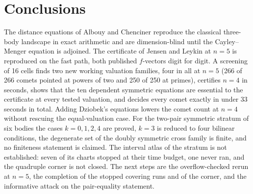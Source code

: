 \documentclass[11pt]{article}
\theoremstyle{definition}
\theoremstyle{remark}
\begin{document}
\section{Conclusions}\label{sec:conclusions}

The distance equations of Albouy and Chenciner reproduce the classical three-body landscape in exact arithmetic and are dimension-blind until the Cayley--Menger equation is adjoined. The
certificate of Jensen and Leykin at $n=5$ is reproduced on the fast path, both published $f$-vectors digit for digit. A screening of 16 cells finds two new working valuation families, four in all
at $n=5$ (266 of 266 comets pointed at powers of two and 250 of 250 at primes), certifies $n=4$ in seconds, shows that the ten dependent symmetric equations are essential to the certificate at
every tested valuation, and decides every comet exactly in under 33 seconds in total. Adding Dziobek's equations lowers the comet count at $n=4$ without rescuing the equal-valuation case. For the
two-pair symmetric stratum of six bodies the cases $k=0,1,2,4$ are proved, $k=3$ is reduced to four bilinear conditions, the degenerate set of the doubly symmetric cross family is finite, and no finiteness
statement is claimed. The interval atlas of the stratum is not established: seven of its charts stopped at their time budget, one never ran, and the quadruple corner is not closed. The next steps are the overflow-checked rerun at $n=5$, the completion of the stopped covering runs and of the corner, and the informative attack on the pair-equality statement.
\end{document}
